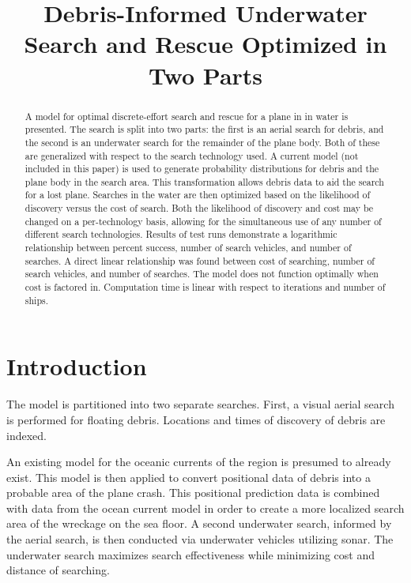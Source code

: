 \documentclass[a4paper]{article}
\title{Debris-Informed Underwater Search and Rescue Optimized in Two Parts}
\author{}
\date{}
\begin{document}
\maketitle

\begin{abstract}
A model for optimal discrete-effort search and rescue for a plane in in water is presented. The search is split into two parts: the first is an aerial search for debris, and the second is an underwater search for the remainder of the plane body. Both of these are generalized with respect to the search technology used. A current model (not included in this paper) is used to generate probability distributions for debris and the plane body in the search area. This transformation allows debris data to aid the search for a lost plane. Searches in the water are then optimized based on the likelihood of discovery versus the cost of search. Both the likelihood of discovery and cost may be changed on a per-technology basis, allowing for the simultaneous use of any number of different search technologies. Results of test runs demonstrate a logarithmic relationship between percent success, number of search vehicles, and number of searches. A direct linear relationship was found between cost of searching, number of search vehicles, and number of searches. The model does not function optimally when cost is factored in. Computation time is linear with respect to iterations and number of ships. 
\end{abstract}

\pagebreak 

\section{Introduction}

The model is partitioned into two separate searches. First, a visual aerial search is performed for floating debris. Locations and times of discovery of debris are indexed. 

An existing model for the oceanic currents of the region is presumed to already exist. This model is then applied to convert positional data of debris into a probable area of the plane crash.  This positional prediction data is combined with data from the ocean current model in order to create a more localized search area of the wreckage on the sea floor. A second underwater search, informed by the aerial search, is then conducted via underwater vehicles utilizing sonar. The underwater search maximizes search effectiveness while minimizing cost and distance of searching. 
\end{document}
